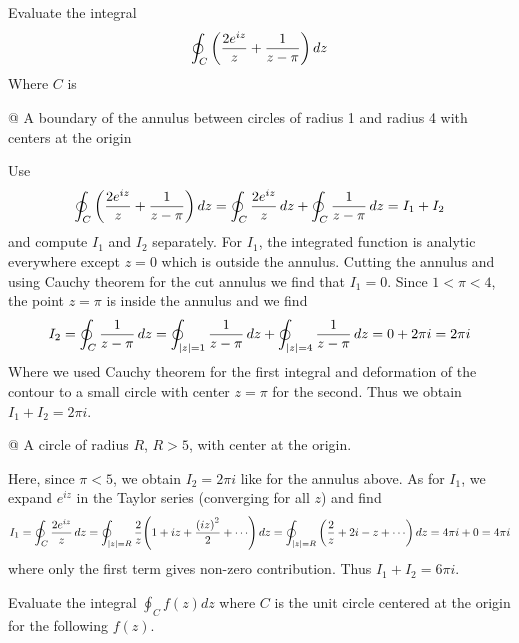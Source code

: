     Evaluate the integral
    \begin{align*}
        \oint_C {\left( \frac{2e^{iz}}{z} + \frac{1}{z-\pi} \right)} \, dz
    \end{align*}
    Where $C$ is
    \begin{easylist}[itemize]
        @ A boundary of the annulus between circles of radius 1 and radius 4
        with centers at the origin

        Use
        \begin{align*}
            \oint_C {\left( \frac{2e^{iz}}{z} + \frac{1}{z-\pi} \right)} \, dz =
            \oint_C \frac{2e^{iz}}{z} \, dz +
            \oint_C \frac{1}{z-\pi} \, dz = I_1 + I_2
        \end{align*}
        and compute $I_1$ and $I_2$ separately.  For $I_1$, the integrated
        function is analytic everywhere except $z=0$ which is outside the
        annulus. Cutting the annulus and using Cauchy theorem for the cut
        annulus we find that $I_1 = 0$. Since $1<\pi<4$, the point $z=\pi$
        is inside the annulus and we find
        \begin{align*}
            I_2 =
            \oint_C \frac{1}{z-\pi} \, dz
            = 
            \oint_{\left\lvert z \right\rvert=1} \frac{1}{z-\pi} \, dz
            +
            \oint_{\left\lvert z \right\rvert=4} \frac{1}{z-\pi} \, dz
            = 0 + 2\pi i = 2\pi i
        \end{align*}
        Where we used Cauchy theorem for the first integral and deformation
        of the contour to a small circle with center $z=\pi$ for the second.
        Thus we obtain $I_1 + I_2 = 2\pi i$.

        @ A circle of radius $R$, $R>5$, with center at the origin.

        Here, since $\pi < 5$, we obtain $I_2 = 2\pi i$ like for the annulus
        above. As for $I_1$, we expand $e^{iz}$ in the Taylor series
        (converging for all $z$) and find
        \begin{align*}
            I_1 = \oint_C \frac{2e^{iz}}{z} \, dz = \oint_{\abs{z}=R}
            \frac{2}{z} \pren{1 + iz + \frac{\pren{iz}^2}{2} + \cdots} \, dz
            = \oint_{\abs{z}=R} \pren{\frac{2}{z} + 2i - z + \cdots} \, dz =
            4 \pi i + 0 = 4 \pi i
        \end{align*}
        where only the first term gives non-zero contribution. Thus
        $I_1+I_2=6\pi i$.
    \end{easylist}

    Evaluate the integral $\oint_C f(z) dz$ where $C$ is the unit circle
    centered at the origin for the following $f(z)$.

